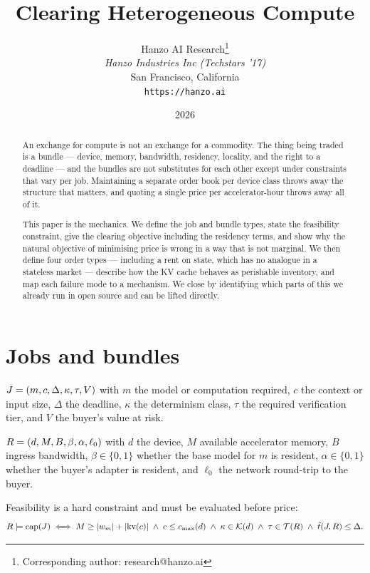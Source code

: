 \documentclass[11pt,a4paper]{article}
\title{Clearing Heterogeneous Compute}
\author{
Hanzo AI Research\thanks{Corresponding author: research@hanzo.ai} \\
\textit{Hanzo Industries Inc (Techstars '17)} \\
San Francisco, California \\
\texttt{https://hanzo.ai}
}
\date{2026}
\begin{document}
\hanzocoverpage

\begin{abstract}
An exchange for compute is not an exchange for a commodity. The thing being
traded is a bundle --- device, memory, bandwidth, residency, locality, and the
right to a deadline --- and the bundles are not substitutes for each other except
under constraints that vary per job. Maintaining a separate order book per device
class throws away the structure that matters, and quoting a single price per
accelerator-hour throws away all of it.

This paper is the mechanics. We define the job and bundle types, state the
feasibility constraint, give the clearing objective including the residency
terms, and show why the natural objective of minimising price is wrong in a way
that is not marginal. We then define four order types --- including a rent on
state, which has no analogue in a stateless market --- describe how the KV cache
behaves as perishable inventory, and map each failure mode to a mechanism. We
close by identifying which parts of this we already run in open source and can
be lifted directly.
\end{abstract}

\tableofcontents
\newpage

\section{Jobs and bundles}

\begin{definition}[Job]
$J = (m, c, \Delta, \kappa, \tau, V)$ with $m$ the model or computation
required, $c$ the context or input size, $\Delta$ the deadline, $\kappa$ the
determinism class, $\tau$ the required verification tier, and $V$ the buyer's
value at risk.
\end{definition}

\begin{definition}[Bundle]
$R = (d, M, B, \beta, \alpha, \ell_{0})$ with $d$ the device, $M$ available
accelerator memory, $B$ ingress bandwidth, $\beta \in \{0,1\}$ whether the base
model for $m$ is resident, $\alpha \in \{0,1\}$ whether the buyer's adapter is
resident, and $\ell_{0}$ the network round-trip to the buyer.
\end{definition}

Feasibility is a hard constraint and must be evaluated before price:
\begin{equation}
R \models \mathrm{cap}(J)
\iff
M \ge |w_{m}| + |\mathrm{kv}(c)|
\;\wedge\;
c \le c_{\max}(d)
\;\wedge\;
\kappa \in \mathcal{K}(d)
\;\wedge\;
\tau \in \mathcal{T}(R)
\;\wedge\;
\hat{t}(J,R) \le \Delta .
\end{equation}
\end{document}
